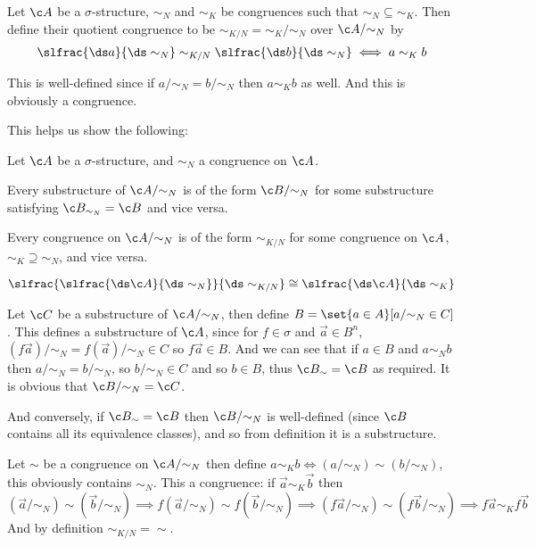 \bdefn

    Let $\c A$ be a $\sigma$-structure, $\sim_N$ and $\sim_K$ be congruences such that $\sim_N\subseteq\sim_K$.
    Then define their {\emphcolor quotient congruence} to be $\sim_{K/N}={\sim_K}/{\sim_N}$ over $\c A/{\sim_N}$ by
    $$ \slfrac{\ds a}{\ds\sim_N} \sim_{K/N} \slfrac{\ds b}{\ds \sim_N} \iff a\sim_Kb $$

\edefn

This is well-defined since if $a/{\sim_N}=b/{\sim_N}$ then $a\sim_Kb$ as well.
And this is obviously a congruence.

This helps us show the following:

\bthrm[title=The Third Isomorphism Theorem]

    Let $\c A$ be a $\sigma$-structure, and $\sim_N$ a congruence on $\c A$.
    \benum
        \item Every substructure of $\c A/{\sim_N}$ is of the form $\c B/{\sim_N}$ for some substructure satisfying $\c B_{\sim_N}=\c B$ and vice versa.
        \item Every congruence on $\c A/{\sim_N}$ is of the form $\sim_{K/N}$ for some congruence on $\c A$, $\sim_K\supseteq\sim_N$, and vice versa.
        \item $$ \slfrac{\slfrac{\ds\c A}{\ds\sim_N}}{\ds\sim_{K/N}} \cong \slfrac{\ds\c A}{\ds\sim_K} $$
    \eenum

\ethrm

\Proof
\benum
    \item Let $\c C$ be a substructure of $\c A/{\sim_N}$, then define $B=\set{a\in A}[a/{\sim_N}\in C]$.
    This defines a substructure of $\c A$, since for $f\in\sigma$ and $\vec a\in B^n$, $(f\vec a)/{\sim_N}=f(\vec a)/{\sim_N}\in C$ so $f\vec a\in B$.
    And we can see that if $a\in B$ and $a\sim_Nb$ then $a/{\sim_N}=b/{\sim_N}$, so $b/{\sim_N}\in C$ and so $b\in B$, thus $\c B_\sim=\c B$ as required.
    It is obvious that $\c B/{\sim_N}=\c C$.

    And conversely, if $\c B_\sim=\c B$ then $\c B/{\sim_N}$ is well-defined (since $\c B$ contains all its equivalence classes), and so from definition it is a substructure.

    \item Let $\sim$ be a congruence on $\c A/{\sim_N}$ then define $a\sim_Kb\iff (a/\sim_N)\sim(b/\sim_N)$, this obviously contains $\sim_N$.
    This a congruence: if $\vec a\sim_K\vec b$ then
    $$ (\vec a/\sim_N)\sim(\vec b/\sim_N) \implies f(\vec a/\sim_N) \sim f(\vec b/\sim_N) \implies (f\vec a/\sim_N)\sim(f\vec b/\sim_N) \implies f\vec a\sim_Kf\vec b $$
    And by definition $\sim_{K/N}=\sim$.

